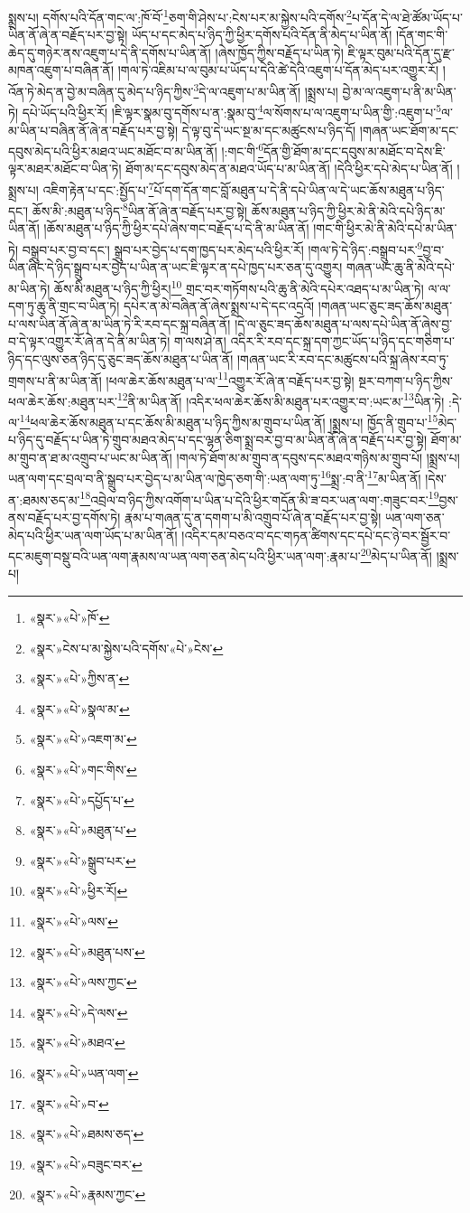 སྨྲས་པ། དགོས་པའི་དོན་གང་ལ་:ཁོ་བོ་\footnote{«སྣར་»«པེ་»ཁོ་}ཅག་གི་ཤེས་པ་:ངེས་པར་མ་སྐྱེས་པའི་དགོས་\footnote{«སྣར་»ངེས་པ་མ་སྐྱེས་པའི་དགོས་«པེ་»ངེས་}པ་དོན་དེ་ལ་ཐེ་ཚོམ་ཡོད་པ་ཡིན་ནོ་ཞེ་ན་བརྗོད་པར་བྱ་སྟེ། ཡོད་པ་དང་མེད་པ་ཉིད་ཀྱི་ཕྱིར་དགོས་པའི་དོན་ནི་མེད་པ་ཡིན་ནོ། །དོན་གང་གི་ཆེད་དུ་གཉེར་ནས་འཇུག་པ་དེ་ནི་དགོས་པ་ཡིན་ནོ། །ཞེས་ཁྱོད་ཀྱིས་བརྗོད་པ་ཡིན་ཏེ། ཇི་ལྟར་བུམ་པའི་དོན་དུ་རྫ་མཁན་འཇུག་པ་བཞིན་ནོ། །གལ་ཏེ་འཇིམ་པ་ལ་བུམ་པ་ཡོད་པ་དེའི་ཚེ་དེའི་འཇུག་པ་དོན་མེད་པར་འགྱུར་རོ། །འོན་ཏེ་མེད་ན་བྱེ་མ་བཞིན་དུ་མེད་པ་ཉིད་ཀྱིས་\footnote{«སྣར་»«པེ་»ཀྱིས་ན་}དེ་ལ་འཇུག་པ་མ་ཡིན་ནོ། །སྨྲས་པ། བྱེ་མ་ལ་འཇུག་པ་ནི་མ་ཡིན་ཏེ། དཔེ་ཡོད་པའི་ཕྱིར་རོ། །ཇི་ལྟར་སྣམ་བུ་དགོས་པ་ན་:སྣམ་བུ་\footnote{«སྣར་»«པེ་»སྣལ་མ་}ལ་སོགས་པ་ལ་འཇུག་པ་ཡིན་གྱི་:འཇུག་པ་\footnote{«སྣར་»«པེ་»འཇག་མ་}ལ་མ་ཡིན་པ་བཞིན་ནོ་ཞེ་ན་བརྗོད་པར་བྱ་སྟེ། དེ་ལྟ་བུ་དེ་ཡང་སྔ་མ་དང་མཚུངས་པ་ཉིད་དོ། །གཞན་ཡང་ཐོག་མ་དང་དབུས་མེད་པའི་ཕྱིར་མཐའ་ཡང་མཐོང་བ་མ་ཡིན་ནོ། །:གང་གི་\footnote{«སྣར་»«པེ་»གང་གིས་}དོན་གྱི་ཐོག་མ་དང་དབུས་མ་མཐོང་བ་དེས་ཇི་ལྟར་མཐར་མཐོང་བ་ཡིན་ཏེ། ཐོག་མ་དང་དབུས་མེད་ན་མཐའ་ཡོད་པ་མ་ཡིན་ནོ། །དེའི་ཕྱིར་དཔེ་མེད་པ་ཡིན་ནོ། །སྨྲས་པ། འཇིག་རྟེན་པ་དང་:སྤྱོད་པ་\footnote{«སྣར་»«པེ་»དཔྱོད་པ་}པོ་དག་དོན་གང་བློ་མཐུན་པ་དེ་ནི་དཔེ་ཡིན་ལ་དེ་ཡང་ཆོས་མཐུན་པ་ཉིད་དང་། ཆོས་མི་:མཐུན་པ་ཉིད་\footnote{«སྣར་»«པེ་»མཐུན་པ་}ཡིན་ནོ་ཞེ་ན་བརྗོད་པར་བྱ་སྟེ། ཆོས་མཐུན་པ་ཉིད་ཀྱི་ཕྱིར་མེ་ནི་མེའི་དཔེ་ཉིད་མ་ཡིན་ནོ། །ཆོས་མཐུན་པ་ཉིད་ཀྱི་ཕྱིར་དཔེ་ཞེས་གང་བརྗོད་པ་དེ་ནི་མ་ཡིན་ནོ། །གང་གི་ཕྱིར་མེ་ནི་མེའི་དཔེ་མ་ཡིན་ཏེ། བསྒྲུབ་པར་བྱ་བ་དང་། སྒྲུབ་པར་བྱེད་པ་དག་ཁྱད་པར་མེད་པའི་ཕྱིར་རོ། །གལ་ཏེ་དེ་ཉིད་:བསྒྲུབ་པར་\footnote{«སྣར་»«པེ་»སྒྲུབ་པར་}བྱ་བ་ཡིན་ཞིང་དེ་ཉིད་སྒྲུབ་པར་བྱེད་པ་ཡིན་ན་ཡང་ཇི་ལྟར་ན་དཔེ་ཁྱད་པར་ཅན་དུ་འགྱུར། གཞན་ཡང་ཆུ་ནི་མེའི་དཔེ་མ་ཡིན་ཏེ། ཆོས་མི་མཐུན་པ་ཉིད་ཀྱི་ཕྱིར།\footnote{«སྣར་»«པེ་»ཕྱིར་རོ།} གྲང་བར་གཏོགས་པའི་ཆུ་ནི་མེའི་དཔེར་འཐད་པ་མ་ཡིན་ཏེ། ལ་ལ་དག་ཏུ་ཆུ་ནི་གྲང་བ་ཡིན་ཏེ། དཔེར་ན་མེ་བཞིན་ནོ་ཞེས་སྨྲས་པ་དེ་དང་འདྲའོ། །གཞན་ཡང་ཅུང་ཟད་ཆོས་མཐུན་པ་ལས་ཡིན་ནོ་ཞེ་ན་མ་ཡིན་ཏེ་རི་རབ་དང་སྐྲ་བཞིན་ནོ། །དེ་ལ་ཅུང་ཟད་ཆོས་མཐུན་པ་ལས་དཔེ་ཡིན་ནོ་ཞེས་བྱ་བ་དེ་ལྟར་འགྱུར་རོ་ཞེ་ན་དེ་ནི་མ་ཡིན་ཏེ། ག་ལས་ཤེ་ན། འདིར་རི་རབ་དང་སྐྲ་དག་ཀྱང་ཡོད་པ་ཉིད་དང་གཅིག་པ་ཉིད་དང་ལུས་ཅན་ཉིད་དུ་ཅུང་ཟད་ཆོས་མཐུན་པ་ཡིན་ནོ། །གཞན་ཡང་རི་རབ་དང་མཚུངས་པའི་སྐྲ་ཞེས་རབ་ཏུ་གྲགས་པ་ནི་མ་ཡིན་ནོ། །ཕལ་ཆེར་ཆོས་མཐུན་པ་ལ་\footnote{«སྣར་»«པེ་»ལས་}འགྱུར་རོ་ཞེ་ན་བརྗོད་པར་བྱ་སྟེ། སྔར་བཀག་པ་ཉིད་ཀྱིས་ཕལ་ཆེར་ཆོས་:མཐུན་པར་\footnote{«སྣར་»«པེ་»མཐུན་པས་}ནི་མ་ཡིན་ནོ། །འདིར་ཕལ་ཆེར་ཆོས་མི་མཐུན་པར་འགྱུར་བ་:ཡང་མ་\footnote{«སྣར་»«པེ་»ལས་ཀྱང་}ཡིན་ཏེ། :དེ་ལ་\footnote{«སྣར་»«པེ་»དེ་ལས་}ཕལ་ཆེར་ཆོས་མཐུན་པ་དང་ཆོས་མི་མཐུན་པ་ཉིད་ཀྱིས་མ་གྲུབ་པ་ཡིན་ནོ། །སྨྲས་པ། ཁྱོད་ནི་གྲུབ་པ་\footnote{«སྣར་»«པེ་»མཐའ་}མེད་པ་ཉིད་དུ་བརྗོད་པ་ཡིན་ཏེ་གྲུབ་མཐའ་མེད་པ་དང་ལྷན་ཅིག་སྨྲ་བར་བྱ་བ་མ་ཡིན་ནོ་ཞེ་ན་བརྗོད་པར་བྱ་སྟེ། ཐོག་མ་མ་གྲུབ་ན་ཐ་མ་འགྲུབ་པ་ཡང་མ་ཡིན་ནོ། །གལ་ཏེ་ཐོག་མ་མ་གྲུབ་ན་དབུས་དང་མཐའ་གཉིས་མ་གྲུབ་པོ། །སྨྲས་པ། ཡན་ལག་དང་བྲལ་བ་ནི་སྒྲུབ་པར་བྱེད་པ་མ་ཡིན་ལ་ཁྱེད་ཅག་གི་:ཡན་ལག་ཏུ་\footnote{«སྣར་»«པེ་»ཡན་ལག་}སྨྲ་:བ་ནི་\footnote{«སྣར་»«པེ་»བ་}མ་ཡིན་ནོ། །དེས་ན་:ཐམས་ཅད་མ་\footnote{«སྣར་»«པེ་»ཐམས་ཅད་}འབྲེལ་བ་ཉིད་ཀྱིས་འགོག་པ་ཡིན་པ་དེའི་ཕྱིར་གདོན་མི་ཟ་བར་ཡན་ལག་:གཟུང་བར་\footnote{«སྣར་»«པེ་»བཟུང་བར་}བྱས་ནས་བརྗོད་པར་བྱ་དགོས་ཏེ། རྣམ་པ་གཞན་དུ་ན་དགག་པ་མི་འགྲུབ་པོ་ཞེ་ན་བརྗོད་པར་བྱ་སྟེ། ཡན་ལག་ཅན་མེད་པའི་ཕྱིར་ཡན་ལག་ཡོད་པ་མ་ཡིན་ནོ། །འདིར་དམ་བཅའ་བ་དང་གཏན་ཚིགས་དང་དཔེ་དང་ཉེ་བར་སྦྱོར་བ་དང་མཇུག་བསྡུ་བའི་ཡན་ལག་རྣམས་ལ་ཡན་ལག་ཅན་མེད་པའི་ཕྱིར་ཡན་ལག་:རྣམ་པ་\footnote{«སྣར་»«པེ་»རྣམས་ཀྱང་}མེད་པ་ཡིན་ནོ། །སྨྲས་པ། 